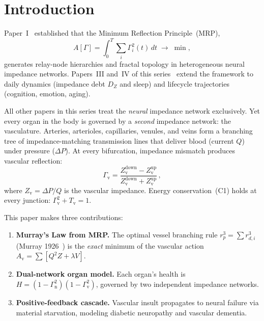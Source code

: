 ﻿\documentclass[aps,pre,twocolumn,superscriptaddress,floatfix]{revtex4-2}
\newcommand{\Gv}{\Gamma_{\mathrm{v}}}
\newcommand{\Gn}{\Gamma_{\mathrm{n}}}
\newcommand{\Tv}{T_{\mathrm{v}}}
\newcommand{\Av}{A_{\mathrm{v}}}
\newcommand{\Zv}{Z_{\mathrm{v}}}
\begin{document}
\maketitle

\section{Introduction}\label{sec:intro}

Paper~I~\cite{paper1} established that the Minimum Reflection
Principle~(MRP),
\begin{equation}\label{eq:mrp}
  A[\Gamma] = \int_0^T \sum_i \Gamma_i^2(t)\,dt \;\to\;\min,
\end{equation}
generates relay-node hierarchies and fractal topology in
heterogeneous neural impedance networks.
Papers~III and~IV of this series~\cite{paper3,paper4}
extend the framework to daily dynamics
(impedance debt $D_Z$ and sleep) and lifecycle trajectories
(cognition, emotion, aging).

All other papers in this series treat the \emph{neural}
impedance network exclusively.
Yet every organ in the body is governed by a \emph{second}
impedance network: the vasculature.
Arteries, arterioles, capillaries, venules, and veins form
a branching tree of impedance-matching transmission lines
that deliver blood (current $Q$) under pressure ($\Delta P$).
At every bifurcation, impedance mismatch produces vascular
reflection:
\begin{equation}\label{eq:gamma_v}
  \Gv = \frac{\Zv^{\text{down}} - \Zv^{\text{up}}}
             {\Zv^{\text{down}} + \Zv^{\text{up}}}\,,
\end{equation}
where $\Zv = \Delta P / Q$ is the vascular impedance.
Energy conservation~(C1) holds at every junction:
$\Gv^2 + \Tv = 1$.

This paper makes three contributions:
\begin{enumerate}
  \item \textbf{Murray's Law from MRP.}
    The optimal vessel branching rule
    $r_p^3 = \sum r_{d,i}^3$ (Murray 1926~\cite{murray1926})
    is the \emph{exact} minimum of the vascular action
    $\Av = \sum [Q^2 Z + \lambda V]$.
  \item \textbf{Dual-network organ model.}
    Each organ's health is $H = (1-\Gn^2)(1-\Gv^2)$,
    governed by two independent impedance networks.
  \item \textbf{Positive-feedback cascade.}
    Vascular insult propagates to neural failure via
    material starvation, modeling diabetic neuropathy
    and vascular dementia.
\end{enumerate}
\end{document}
